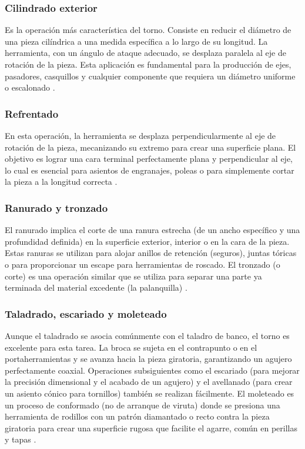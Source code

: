 \documentclass[12pt,a4paper]{article}
\begin{document}
\subsubsection{Cilindrado exterior}
Es la operación más característica del torno. Consiste en reducir el diámetro de una pieza cilíndrica a una medida específica a lo largo de su longitud. La herramienta, con un ángulo de ataque adecuado, se desplaza paralela al eje de rotación de la pieza. Esta aplicación es fundamental para la producción de ejes, pasadores, casquillos y cualquier componente que requiera un diámetro uniforme o escalonado \cite{groover2020, lascano2015}.

\subsubsection{Refrentado}
En esta operación, la herramienta se desplaza perpendicularmente al eje de rotación de la pieza, mecanizando su extremo para crear una superficie plana. El objetivo es lograr una cara terminal perfectamente plana y perpendicular al eje, lo cual es esencial para asientos de engranajes, poleas o para simplemente cortar la pieza a la longitud correcta \cite{groover2020, arango2012}.

\subsubsection{Ranurado y tronzado}
El ranurado implica el corte de una ranura estrecha (de un ancho específico y una profundidad definida) en la superficie exterior, interior o en la cara de la pieza. Estas ranuras se utilizan para alojar anillos de retención (seguros), juntas tóricas o para proporcionar un escape para herramientas de roscado. El tronzado (o corte) es una operación similar que se utiliza para separar una parte ya terminada del material excedente (la palanquilla) \cite{torno_protocolo, lascano2015}.

\subsubsection{Taladrado, escariado y moleteado}
Aunque el taladrado se asocia comúnmente con el taladro de banco, el torno es excelente para esta tarea. La broca se sujeta en el contrapunto o en el portaherramientas y se avanza hacia la pieza giratoria, garantizando un agujero perfectamente coaxial. Operaciones subsiguientes como el escariado (para mejorar la precisión dimensional y el acabado de un agujero) y el avellanado (para crear un asiento cónico para tornillos) también se realizan fácilmente. El moleteado es un proceso de conformado (no de arranque de viruta) donde se presiona una herramienta de rodillos con un patrón diamantado o recto contra la pieza giratoria para crear una superficie rugosa que facilite el agarre, común en perillas y tapas \cite{degarmo2011, quintero2018}.
\end{document}
